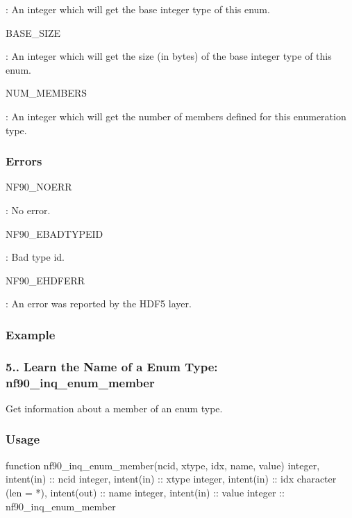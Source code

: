 \+: An integer which will get the base integer type of this enum.

{\ttfamily B\+A\+S\+E\+\_\+\+S\+I\+ZE}

\+: An integer which will get the size (in bytes) of the base integer type of this enum.

{\ttfamily N\+U\+M\+\_\+\+M\+E\+M\+B\+E\+RS}

\+: An integer which will get the number of members defined for this enumeration type.

\subsubsection*{Errors}

{\ttfamily N\+F90\+\_\+\+N\+O\+E\+RR}

\+: No error.

{\ttfamily N\+F90\+\_\+\+E\+B\+A\+D\+T\+Y\+P\+E\+ID}

\+: Bad type id.

{\ttfamily N\+F90\+\_\+\+E\+H\+D\+F\+E\+RR}

\+: An error was reported by the H\+D\+F5 layer.

\subsubsection*{Example}\hypertarget{f90-user-defined-data-types_f90-learn-the-name-of-a-enum-type-nf90_inq_enum_member}{}\subsubsection{5.. Learn the Name of a Enum Type\+: nf90\+\_\+inq\+\_\+enum\+\_\+member}\label{f90-user-defined-data-types_f90-learn-the-name-of-a-enum-type-nf90_inq_enum_member}
Get information about a member of an enum type.

\subsubsection*{Usage}


\begin{DoxyCode}
\textcolor{keyword}{function }nf90\_inq\_enum\_member(ncid, xtype, idx, name, value)
  \textcolor{keywordtype}{integer}, \textcolor{keywordtype}{intent(in)} :: ncid
  \textcolor{keywordtype}{integer}, \textcolor{keywordtype}{intent(in)} :: xtype
  \textcolor{keywordtype}{integer}, \textcolor{keywordtype}{intent(in)} :: idx
  \textcolor{keywordtype}{character (len = *)}, \textcolor{keywordtype}{intent(out)} :: name
  \textcolor{keywordtype}{integer}, \textcolor{keywordtype}{intent(in)} :: value
  \textcolor{keywordtype}{integer} :: nf90\_inq\_enum\_member
\end{DoxyCode}



